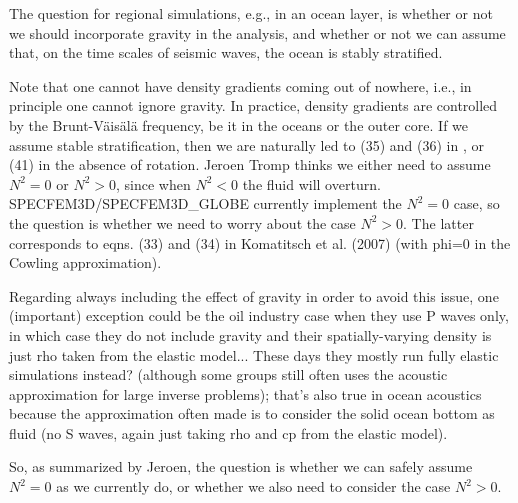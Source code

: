 The question for regional simulations, e.g., in an ocean layer, is whether or not we should incorporate gravity in the analysis, and whether or not we can assume that, on the time scales of seismic waves, the ocean is stably stratified.
\newline

Note that one cannot have density gradients coming out of nowhere, i.e., in principle one cannot ignore gravity. In practice, density gradients are controlled by the Brunt-V\"ais\"al\"a frequency, be it in the oceans or the outer core. If we assume stable stratification, then we are naturally led to (35) and (36) in \cite{KoTsTr05}, or (41) in the absence of rotation. Jeroen Tromp thinks we either need to assume $N^2=0$ or $N^2>0$, since when $N^2<0$ the fluid will overturn. SPECFEM3D/SPECFEM3D\_GLOBE currently implement the $N^2=0$ case, so the question is whether we need to worry about the case $N^2>0$. The latter corresponds to eqns. (33) and (34) in Komatitsch et al. (2007) (with phi=0 in the Cowling approximation).
\newline

Regarding always including the effect of gravity in order to avoid this issue,
one (important) exception could be the oil industry case when they use P waves only, in which case they do not include gravity and their spatially-varying density is just rho taken from the elastic model... These days they mostly run fully elastic simulations instead? (although some groups still often uses the acoustic approximation for large inverse problems); that's also true in ocean acoustics because the approximation often made is to consider the solid ocean bottom as fluid (no S waves, again just taking rho and cp from the elastic model).
\newline

So, as summarized by Jeroen, the question is whether we can safely assume $N^2=0$ as we currently do, or whether we also need to consider the case $N^2>0$.

